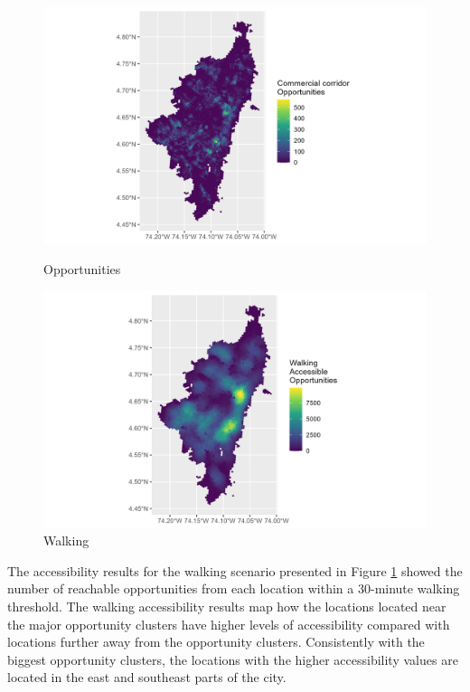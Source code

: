 \documentclass[12pt, a4paper]{report}
\begin{document}
\begin{figure}[H]
    \centering
    \begin{minipage}{0.45\textwidth}
        \centering
        \includegraphics[width=1.3\linewidth]{Data/Results/Images/Opportunities_COD_21.png}
         \caption{Opportunities}
        \label{fig:Results_Opportunities}
    \end{minipage}%
    \hfill
    \begin{minipage}{0.45\textwidth}
        \centering
        \includegraphics[width=1.3\linewidth]{Data/Results/Images/Access_Walk_base.png}
        \caption{Walking}
        \label{fig:Results_Walking}
    \end{minipage}
\end{figure}

The accessibility results for the walking scenario presented in Figure \ref{fig:Results_Walking} showed the number of reachable opportunities from each location within a 30-minute walking threshold. The walking accessibility results map how the locations located near the major opportunity clusters have higher levels of accessibility compared with locations further away from the opportunity clusters. Consistently with the biggest opportunity clusters, the locations with the higher accessibility values are located in the east and southeast parts of the city.
\end{document}
